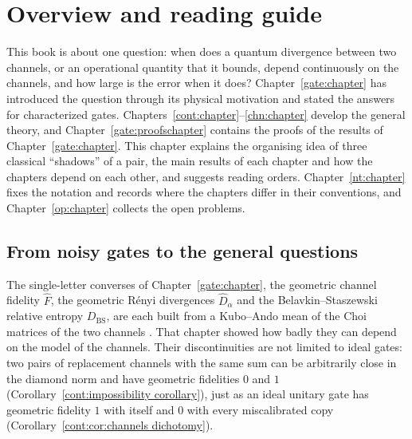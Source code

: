 \chapter{Overview and reading guide}\label{ov:chapter}
\begingroup

This book is about one question: when does a quantum divergence between two channels, or an operational quantity that it bounds, depend continuously on the channels, and how large is the error when it does? Chapter~\ref{gate:chapter} has introduced the question through its physical motivation and stated the answers for characterized gates. Chapters~\ref{cont:chapter}--\ref{chn:chapter} develop the general theory, and Chapter~\ref{gate:proofschapter} contains the proofs of the results of Chapter~\ref{gate:chapter}. This chapter explains the organising idea of three classical ``shadows'' of a pair, the main results of each chapter and how the chapters depend on each other, and suggests reading orders. Chapter~\ref{nt:chapter} fixes the notation and records where the chapters differ in their conventions, and Chapter~\ref{op:chapter} collects the open problems.

\section{From noisy gates to the general questions}\label{ov:sec:problem}

The single-letter converses of Chapter~\ref{gate:chapter}, the geometric channel fidelity $\widehat F$, the geometric R\'enyi divergences $\widehat D_\alpha$ and the Belavkin--Staszewski relative entropy $D_{\mathrm{BS}}$, are each built from a Kubo--Ando mean of the Choi matrices of the two channels \cite{KatariyaWilde2021,FangFawzi2021}. That chapter showed how badly they can depend on the model of the channels. Their discontinuities are not limited to ideal gates: two pairs of replacement channels with the same sum can be arbitrarily close in the diamond norm and have geometric fidelities $0$ and $1$ (Corollary~\ref{cont:impossibility corollary}), just as an ideal unitary gate has geometric fidelity $1$ with itself and $0$ with every miscalibrated copy (Corollary~\ref{cont:cor:channels dichotomy}).

